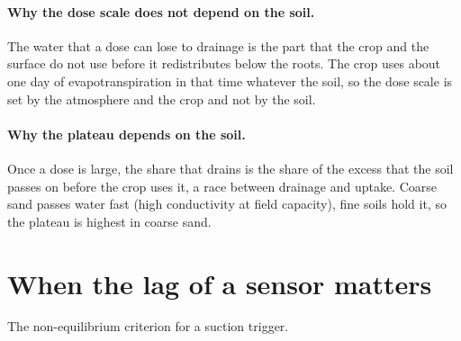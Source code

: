 \paragraph{Why the dose scale does not depend on the soil.} The water that a dose can lose to drainage is the part that the crop and the surface do not use before it redistributes below the roots. The crop uses about one day of evapotranspiration in that time whatever the soil, so the dose scale is set by the atmosphere and the crop and not by the soil.

\paragraph{Why the plateau depends on the soil.} Once a dose is large, the share that drains is the share of the excess that the soil passes on before the crop uses it, a race between drainage and uptake. Coarse sand passes water fast (high conductivity at field capacity), fine soils hold it, so the plateau is highest in coarse sand.

\section{When the lag of a sensor matters}
The non-equilibrium criterion for a suction trigger.

